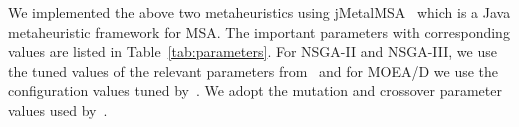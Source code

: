 We implemented the above two metaheuristics using jMetalMSA~\citep{zambrano2017multi} which is a Java metaheuristic framework for MSA. The important parameters with corresponding values are listed in Table~\ref{tab:parameters}. For NSGA-II and NSGA-III, we use the tuned values of the relevant parameters from~\cite{ortuno2013optimizing} and for MOEA/D we use the configuration values tuned by~\citep{zhu2015novel}. We adopt the mutation and crossover parameter values used by~\cite{ortuno2013optimizing}. 

